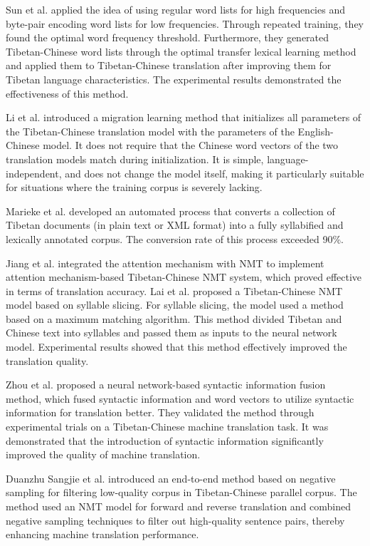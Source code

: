 \documentclass[acmsmall]{acmart}
\begin{document}
Sun et al. \cite{4-16b3} applied the idea of using regular word lists for high frequencies and byte-pair encoding word lists for low frequencies. Through repeated training, they found the optimal word frequency threshold. Furthermore, they generated Tibetan-Chinese word lists through the optimal transfer lexical learning method and applied them to Tibetan-Chinese translation after improving them for Tibetan language characteristics. The experimental results demonstrated the effectiveness of this method.

Li et al. \cite{4-14} introduced a migration learning method that initializes all parameters of the Tibetan-Chinese translation model with the parameters of the English-Chinese model. It does not require that the Chinese word vectors of the two translation models match during initialization. It is simple, language-independent, and does not change the model itself, making it particularly suitable for situations where the training corpus is severely lacking.

Marieke et al. \cite{4add-tow} developed an automated process that converts a collection of Tibetan documents (in plain text or XML format) into a fully syllabified and lexically annotated corpus. The conversion rate of this process exceeded 90\%.

Jiang et al. \cite{4-17} integrated the attention mechanism with NMT to implement attention mechanism-based Tibetan-Chinese NMT system, which proved effective in terms of translation accuracy. Lai et al. \cite{4-18} proposed a Tibetan-Chinese NMT model based on syllable slicing. For syllable slicing, the model used a method based on a maximum matching algorithm. This method divided Tibetan and Chinese text into syllables and passed them as inputs to the neural network model. Experimental results showed that this method effectively improved the translation quality.

Zhou et al. \cite{4-18b1} proposed a neural network-based syntactic information fusion method, which fused syntactic information and word vectors to utilize syntactic information for translation better. They validated the method through experimental trials on a Tibetan-Chinese machine translation task. It was demonstrated that the introduction of syntactic information significantly improved the quality of machine translation.

Duanzhu Sangjie et al. \cite{4-18b2} introduced an end-to-end method based on negative sampling for filtering low-quality corpus in Tibetan-Chinese parallel corpus. The method used an NMT model for forward and reverse translation and combined negative sampling techniques to filter out high-quality sentence pairs, thereby enhancing machine translation performance.
\end{document}
